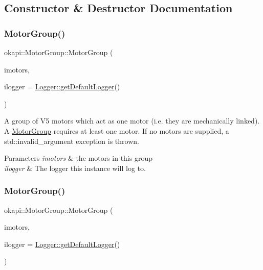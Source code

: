 \subsection{Constructor \& Destructor Documentation}
\mbox{\label{classokapi_1_1MotorGroup_a6bc96434556403fecf7e715faa6359f9}} 
\subsubsection{\texorpdfstring{MotorGroup()}{MotorGroup()}\hspace{0.1cm}{\footnotesize\ttfamily [1/2]}}
{\footnotesize\ttfamily okapi\+::\+Motor\+Group\+::\+Motor\+Group (\begin{DoxyParamCaption}\item[{const std\+::initializer\+\_\+list$<$ \mbox{\hyperlink{classokapi_1_1Motor}{Motor}} $>$ \&}]{imotors,  }\item[{const std\+::shared\+\_\+ptr$<$ \mbox{\hyperlink{classokapi_1_1Logger}{Logger}} $>$ \&}]{ilogger = {\ttfamily \mbox{\hyperlink{classokapi_1_1Logger_a5053cf778b4b55acba788a3797dc96d2}{Logger\+::get\+Default\+Logger}}()} }\end{DoxyParamCaption})}

A group of V5 motors which act as one motor (i.\+e. they are mechanically linked). A \mbox{\hyperlink{classokapi_1_1MotorGroup}{Motor\+Group}} requires at least one motor. If no motors are supplied, a std\+::invalid\+\_\+argument exception is thrown.


\begin{DoxyParams}{Parameters}
{\em imotors} & the motors in this group \\
\hline
{\em ilogger} & The logger this instance will log to. \\
\hline
\end{DoxyParams}
\mbox{\label{classokapi_1_1MotorGroup_a7b0d2c64bb1c78c117160b8dfeb07611}} 
\subsubsection{\texorpdfstring{MotorGroup()}{MotorGroup()}\hspace{0.1cm}{\footnotesize\ttfamily [2/2]}}
{\footnotesize\ttfamily okapi\+::\+Motor\+Group\+::\+Motor\+Group (\begin{DoxyParamCaption}\item[{const std\+::initializer\+\_\+list$<$ std\+::shared\+\_\+ptr$<$ \mbox{\hyperlink{classokapi_1_1AbstractMotor}{Abstract\+Motor}} $>$$>$ \&}]{imotors,  }\item[{const std\+::shared\+\_\+ptr$<$ \mbox{\hyperlink{classokapi_1_1Logger}{Logger}} $>$ \&}]{ilogger = {\ttfamily \mbox{\hyperlink{classokapi_1_1Logger_a5053cf778b4b55acba788a3797dc96d2}{Logger\+::get\+Default\+Logger}}()} }\end{DoxyParamCaption})}

